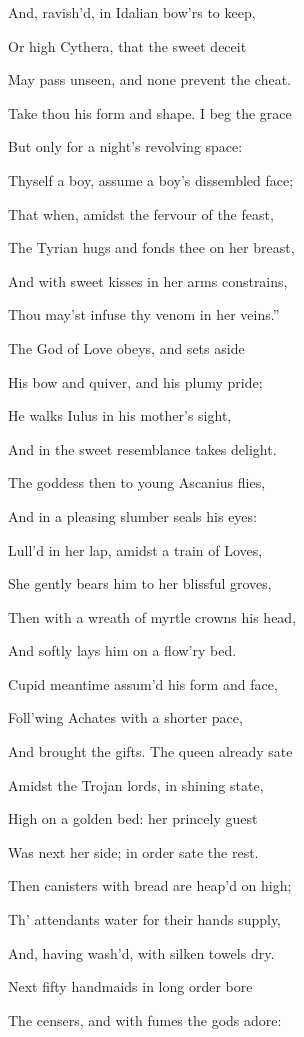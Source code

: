And, ravish’d, in Idalian bow’rs to keep,

Or high Cythera, that the sweet deceit

May pass unseen, and none prevent the cheat.

Take thou his form and shape. I beg the grace

But only for a night’s revolving space:

Thyself a boy, assume a boy’s dissembled face;

That when, amidst the fervour of the feast,

The Tyrian hugs and fonds thee on her breast,

And with sweet kisses in her arms constrains,

Thou may’st infuse thy venom in her veins.”

The God of Love obeys, and sets aside

His bow and quiver, and his plumy pride;

He walks Iulus in his mother’s sight,

And in the sweet resemblance takes delight.

The goddess then to young Ascanius flies,

And in a pleasing slumber seals his eyes:

Lull’d in her lap, amidst a train of Loves,

She gently bears him to her blissful groves,

Then with a wreath of myrtle crowns his head,

And softly lays him on a flow’ry bed.

Cupid meantime assum’d his form and face,

Foll’wing Achates with a shorter pace,

And brought the gifts. The queen already sate

Amidst the Trojan lords, in shining state,

High on a golden bed: her princely guest

Was next her side; in order sate the rest.

Then canisters with bread are heap’d on high;

Th’ attendants water for their hands supply,

And, having wash’d, with silken towels dry.

Next fifty handmaids in long order bore

The censers, and with fumes the gods adore:

